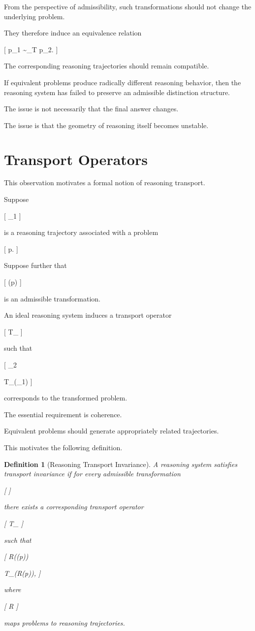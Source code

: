 \documentclass[11pt,oneside,openany]{book}
\newtheorem{definition}{Definition}[chapter] \newtheorem{theorem}{Theorem}[chapter] \newtheorem{proposition}{Proposition}[chapter] \newtheorem{lemma}{Lemma}[chapter] \newtheorem{corollary}{Corollary}[chapter] \newtheorem{remark}{Remark}[chapter]
\begin{document}
From the perspective of admissibility, such transformations should not change the underlying problem.

They therefore induce an equivalence relation

[
p_1
\sim_T
p_2.
]

The corresponding reasoning trajectories should remain compatible.

If equivalent problems produce radically different reasoning behavior, then the reasoning system has failed to preserve an admissible distinction structure.

The issue is not necessarily that the final answer changes.

The issue is that the geometry of reasoning itself becomes unstable.

\section{Transport Operators}

This observation motivates a formal notion of reasoning transport.

Suppose

[
\gamma_1
]

is a reasoning trajectory associated with a problem

[
p.
]

Suppose further that

[
\tau(p)
]

is an admissible transformation.

An ideal reasoning system induces a transport operator

[
T_\tau
]

such that

[
\gamma_2

T_\tau(\gamma_1)
]

corresponds to the transformed problem.

The essential requirement is coherence.

Equivalent problems should generate appropriately related trajectories.

This motivates the following definition.

\begin{definition}[Reasoning Transport Invariance]

A reasoning system satisfies transport invariance if for every admissible transformation

[
\tau
]

there exists a corresponding transport operator

[
T_\tau
]

such that

[
R(\tau(p))

T_\tau(R(p)),
]

where

[
R
]

maps problems to reasoning trajectories.

\end{definition}
\end{document}
